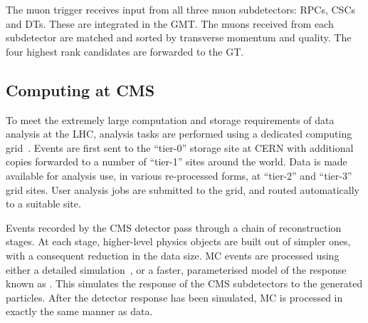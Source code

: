 The muon trigger receives input from all three muon subdetectors: \acp{RPC},
\acp{CSC} and \acp{DT}. These are integrated in the \ac{GMT}. The muons received
from each subdetector are matched and sorted by transverse momentum and
quality. The four highest rank candidates are forwarded to the \ac{GT}.

\subsection{Computing at \acs{CMS}}
\label{sec:cms_computing}
To meet the extremely large computation and storage requirements of data analysis
at the \ac{LHC}, analysis tasks are performed using a dedicated computing
grid~\cite{lhc_grid}. Events are first sent to the ``tier-0'' storage site at
\ac{CERN} with additional copies forwarded to a number of ``tier-1'' sites
around the world. Data is made available for analysis use, in various
re-processed forms, at ``tier-2'' and ``tier-3'' grid sites. User analysis jobs
are submitted to the grid, and routed automatically to a suitable site.

Events recorded by the \ac{CMS} detector pass through a chain of reconstruction
stages. At each stage, higher-level physics objects are built out of simpler
ones, with a consequent reduction in the data size. \ac{MC} events are processed
using either a detailed \geantfour simulation~\cite{geant_paper}, or a faster,
parameterised model of the response known as \fastsim. This simulates the
response of the \ac{CMS} subdetectors to the generated particles. After the
detector response has been simulated, \ac{MC} is processed in exactly the same
manner as data.
